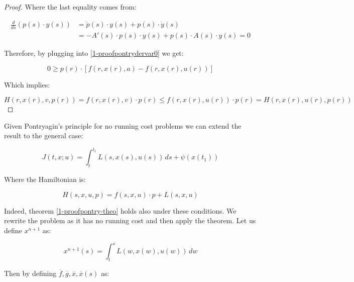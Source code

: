 \begin{theorem}
\begin{proof}
        Where the last equality comes from:

        \begin{align*}
            \frac{d}{ds}\left(p(s)\cdot y(s)\right) & = \dot{p}(s)\cdot y(s) + p(s)\cdot \dot{y}(s) \\
            & = -A'(s)\cdot p(s)\cdot y(s) + p(s) \cdot A(s)\cdot y(s) = 0
        \end{align*}

        Therefore, by plugging into \ref{1-proofpontrydervar0} we get:

        \[0\geq p(r)\cdot[f(r,x(r),a)-f(r,x(r),u(r))]\]

        Which implies:

        \[H(r,x(r),v,p(r)) = f(r,x(r),v) \cdot p(r) \leq f(r,x(r),u(r)) \cdot p(r) = H(r,x(r),u(r),p(r))\]
    \end{proof}
\end{theorem}

Given Pontryagin's principle for no running cost problems we can extend the result to the general case:

\begin{equation}
    J(t,x;u) = \int_t^{t_1} L(s,x(s),u(s)) \,ds + \psi(x(t_1))
\end{equation}

Where the Hamiltonian is:

\begin{equation}
    H(s,x,u,p) = f(s,x,u)\cdot p + L(s,x,u)
\end{equation}

Indeed, theorem \ref{1-proofpontry-theo} holds also under these conditions. We rewrite the problem as it has no 
running cost and then apply the theorem. Let us define $x^{n+1}$ as:


\begin{equation}
    x^{n+1}(s) = \int_t^s L(w,x(w),u(w)) \,dw
\end{equation}

Then by defining $\overline{f}, \overline{g}, \overline{x},\overline{x}(s)$ as:

